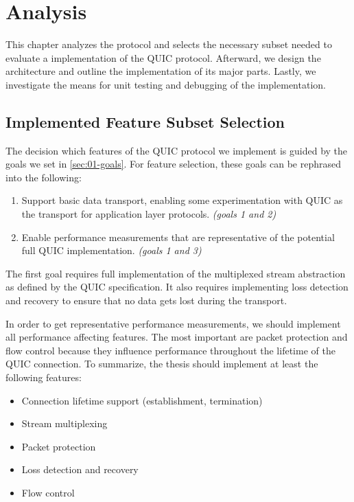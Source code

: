 \chapter{Analysis}\label{chap:03-analysis}

This chapter analyzes the protocol and selects the necessary subset needed to evaluate a \dotnet{}
implementation of the QUIC protocol. Afterward, we design the architecture and outline the
implementation of its major parts. Lastly, we investigate the means for unit testing and debugging
of the implementation.

\section{Implemented Feature Subset Selection}\label{sec:03-feature-selection}

The decision which features of the QUIC protocol we implement is guided by the goals we set in
\autoref{sec:01-goals}. For feature selection, these goals can be rephrased into the following:

\begin{enumerate}

  \item Support basic data transport, enabling some experimentation with QUIC as the transport for
application layer protocols. \textit{(goals 1 and 2)}

  \item Enable performance measurements that are representative of the potential full QUIC
implementation. \textit{(goals 1 and 3)}

\end{enumerate}

The first goal requires full implementation of the multiplexed stream abstraction as defined by the
QUIC specification. It also requires implementing loss detection and recovery to ensure that no data
gets lost during the transport.

In order to get representative performance measurements, we should implement all performance
affecting features. The most important are packet protection and flow control because they influence
performance throughout the lifetime of the QUIC connection. To summarize, the thesis should
implement at least the following features:

\begin{itemize}

    \item Connection lifetime support (establishment, termination)

    \item Stream multiplexing

    \item Packet protection

    \item Loss detection and recovery

    \item Flow control

\end{itemize}

